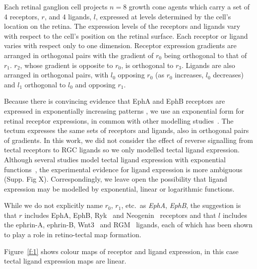 \documentclass[11pt, a4paper]{article}
\begin{document}
Each retinal ganglion cell projects $n=8$ growth cone agents which carry a set
of 4 receptors, $r$, and 4 ligands, $l$, expressed at levels determined by the
cell's location on the retina. The expression levels of the receptors and
ligands vary with respect to the cell's position on the retinal surface. Each
receptor or ligand varies with respect only to one dimension.  Receptor
expression gradients are arranged in orthogonal pairs with the gradient of
$r_0$ being orthogonal to that of $r_1$. $r_2$, whose gradient is opposite to
$r_0$, is orthogonal to $r_3$. Ligands are also arranged in orthogonal pairs,
with $l_0$ opposing $r_0$ (as $r_0$ increases, $l_0$ decreases) and $l_1$
orthogonal to $l_0$ and opposing $r_1$.

Because there is convincing evidence that EphA and EphB receptors are
expressed in exponentially increasing
patterns \cite{reber_relative_2004,feldheim_genetic_2000,brown_topographic_2000,koulakov_stochastic_2004},
we use an exponential form for retinal receptor expressions, in common with
other modelling
studies~\cite{reber_relative_2004,koulakov_stochastic_2004,simpson_simple_2011}.
%
The tectum expresses the same sets of receptors and ligands, also in
orthogonal pairs of gradients. In this work, we did not consider the effect of
reverse signalling from tectal receptors to RGC ligands so we only modelled
tectal ligand expression. Although several studies model tectal ligand
expression with exponential functions~\cite{koulakov_stochastic_2004}, the
experimental evidence for ligand expression is more ambiguous (Supp. Fig
X). Correspondingly, we leave open the possibility that ligand expression may
be modelled by exponential, linear or logarithmic functions.

While we do not explicitly name $r_0$, $r_1$,
etc.~as \emph{EphA}, \emph{EphB}, the suggestion is that $r$ includes EphA,
EphB, Ryk~\cite{schmitt_wntryk_2006} and
Neogenin~\cite{rajagopalan_neogenin_2004} receptors and that $l$ includes the
ephrin-A, ephrin-B, Wnt3~\cite{schmitt_wntryk_2006} and
RGM~\cite{monnier_rgm_2002} ligands, each of which has been shown to play a
role in retino-tectal map formation.

Figure~\ref{f:1} shows colour maps of receptor and ligand
expression, in this case tectal ligand expression maps are linear.
\end{document}
